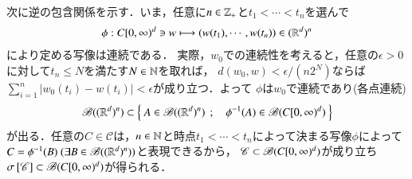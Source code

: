 \begin{prf}
\begin{description}
			次に逆の包含関係を示す．いま，任意に$n \in \mathbb{Z}_+$と$t_1 < \cdots < t_n$を選んで
			\begin{align}
				\phi : C[0,\infty)^d \ni w \longmapsto (w(t_1),\cdots, w(t_n)) \in (\mathbb{R}^d)^n
			\end{align}
			により定める写像は連続である．
			実際，$w_0$での連続性を考えると，任意の$\epsilon > 0$に対して$t_n \leq N$を満たす$N \in \mathbb{N}$を取れば，
			$d(w_0,w) < \epsilon/(n2^N)$ならば
			$\sum_{i=1}^{n}|w_0(t_i) - w(t_i)| < \epsilon$が成り立つ．よって
			$\phi$は$w_0$で連続であり(各点連続)
			\begin{align}
				\mathscr{B}((\mathbb{R}^d)^n) \subset \left\{\ A \in \mathscr{B}((\mathbb{R}^d)^n)\ \, ; \quad \phi^{-1}(A) \in \mathscr{B}(C[0,\infty)^d)\ \right\}
			\end{align}
			が出る．任意の$C \in \mathscr{C}$は，$n \in \mathbb{N}$と時点$t_1 < \cdots < t_n$によって決まる写像$\phi$によって
			$C = \phi^{-1}(B)\ (\exists B \in \mathscr{B}((\mathbb{R}^d)^n))$と表現できるから，
			$\mathscr{C} \subset \mathscr{B}(C[0,\infty)^d)$が成り立ち
			$\sigma \left[\mathscr{C}\right] \subset \mathscr{B}(C[0,\infty)^d)$が得られる．
			

\end{description}
\end{prf}
